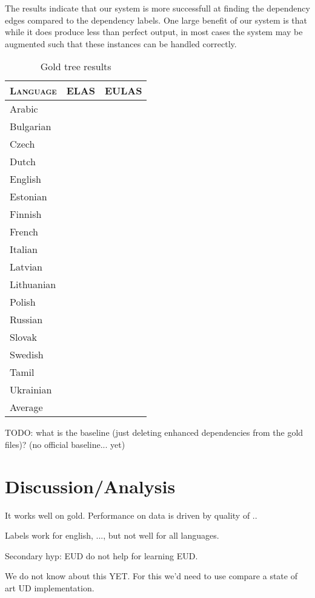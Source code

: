 \documentclass[11pt,a4paper]{article}
\begin{document}
The results indicate that our system is more successfull at
finding the dependency edges compared to the dependency
labels. One large benefit of our system is that while it does
produce less than perfect output, in most cases the system may be
augmented such that these instances can be handled correctly.

    
\begin{table}[h]
	\centering
	\begin{tabular}{l|rr}
		\textsc{Language} & \textsc{ELAS} & \textsc{EULAS} \\
		\hline 
		Arabic &  & \\
		Bulgarian &  & \\
		Czech &  & \\
		Dutch &  & \\
		English &  & \\
		Estonian &  & \\
		Finnish &  & \\
		French &  & \\
		Italian &  & \\
		Latvian &  & \\
		Lithuanian &  & \\
		Polish &  & \\
		Russian &  & \\
		Slovak &  & \\
		Swedish &  & \\
		Tamil &  & \\
		Ukrainian &  & \\
		Average &  & \\ 
	\end{tabular}
	\caption{Gold tree results}
\end{table} 

TODO: what is the baseline (just deleting enhanced dependencies from the gold files)? (no official baseline... yet)

\section{Discussion/Analysis}


It works well on gold.
Performance on data is driven by quality of ..

Labels work for english, ...,  but not well for all languages.

Secondary hyp: EUD do not help for learning EUD.

We do not know about this YET. For this we'd need to use compare a
state of art UD implementation.
\end{document}
